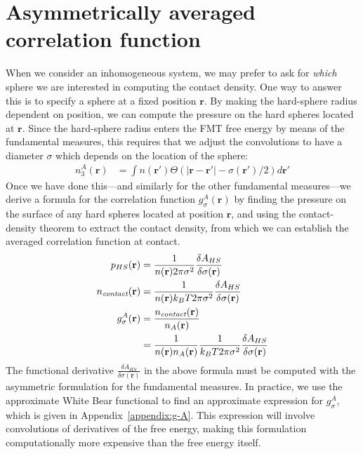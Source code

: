 \documentclass[letterpaper,twocolumn,amsmath,amssymb,jcp,10pt,aip]{revtex4-1}
\newcommand{\rr}{\textbf{r}}
\begin{document}
\section{Asymmetrically averaged correlation function}\label{sec:g-A}

When we consider an inhomogeneous system, we may prefer to ask for
\emph{which} sphere we are interested in computing the contact
density.  One way to answer this is to specify a sphere at a fixed
position $\mathbf{r}$.  By making the hard-sphere radius dependent on
position, we can compute the pressure on the hard spheres located at
$\mathbf{r}$.  Since the hard-sphere radius enters the FMT free energy
by means of the fundamental measures, this requires that we adjust the
convolutions to have a diameter $\sigma$ which depends on the location
of the sphere:
\begin{align}
  n_3^A(\rr) &= \int n(\rr')\Theta(|\rr-\rr'|-\sigma(\rr')/2)d\rr' \label{eq:n3A}
\end{align}
Once we have done this---and similarly for the other fundamental
measures---we derive a formula for the correlation function
$g_\sigma^A(\rr)$ by finding the pressure on the surface of any hard
spheres located at position $\rr$, and using the contact-density
theorem to extract the contact density, from which we can establish
the averaged correlation function at contact.
\begin{align}
  p_{HS}(\mathbf{r}) &= \frac{1}{n(\rr) 2\pi \sigma^2} \frac{\delta
    A_{HS}}{\delta \sigma(\mathbf{r})} \label{eq:p_{HS}^A}\\
  \ncontact(\rr) &= \frac{1}{n(\rr) k_BT 2\pi \sigma^2} \frac{\delta
    A_{HS}}{\delta \sigma(\mathbf{r})} \\
  g_\sigma^A(\rr) &= \frac{\ncontact(\rr)}{n_A(\rr)} \\
  &= \frac{1}{n(\rr) n_A(\rr)}\frac{1}{ k_BT 2\pi \sigma^2} \frac{\delta
    A_{HS}}{\delta \sigma(\mathbf{r})} \label{eq:g-A-exact}
\end{align}
The functional derivative $\frac{\delta A_{HS}}{\delta \sigma(\mathbf{r})}$
in the above formula must be computed with the asymmetric formulation
for the fundamental measures.  In practice, we use the approximate
White Bear functional to find an approximate expression for
$g_\sigma^A$, which is given in Appendix~\ref{appendix:g-A}.  This
expression will involve convolutions of derivatives of the free
energy, making this formulation computationally more expensive than
the free energy itself.
\end{document}
